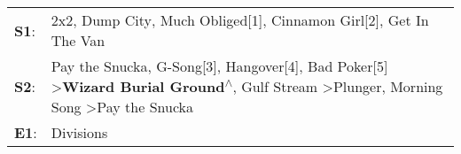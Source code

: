 \begin{supertabular}{p{0.03\textwidth}p{0.92\textwidth}}
 \textbf{S1}:  &                                                                                                                                                                                                                                2x2\textsuperscript{}, \enspace Dump City\textsuperscript{}, \enspace Much Obliged[1]\textsuperscript{}, \enspace Cinnamon Girl[2]\textsuperscript{}, \enspace Get In The Van\textsuperscript{}  \enspace  \\
 \textbf{S2}:  &  Pay the Snucka\textsuperscript{}, \enspace G-Song[3]\textsuperscript{}, \enspace Hangover[4]\textsuperscript{}, \enspace Bad Poker[5]\textsuperscript{} \textgreater \enspace \textbf{Wizard Burial Ground\textsuperscript{$\wedge$}}, \enspace Gulf Stream\textsuperscript{} \textgreater \enspace Plunger\textsuperscript{}, \enspace Morning Song\textsuperscript{} \textgreater \enspace Pay the Snucka\textsuperscript{}  \enspace  \\
 \textbf{E1}:  &                                                                                                                                                                                                                                                                                                                                                                                                    Divisions\textsuperscript{}  \enspace  \\
\end{supertabular}
